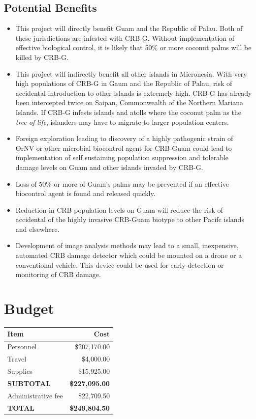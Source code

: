 \documentclass[12pt,letterpaper,english,bibliography=totocnumbered, abstract=on]{scrartcl}
\begin{document}
\subsection{Potential Benefits}
\begin{itemize}
\item This project will directly benefit Guam and the Republic of Palau.
Both of these jurisdictions are infested with CRB-G. Without implementation
of effective biological control, it is likely that 50\% or more coconut
palms will be killed by CRB-G.
\item This project will indirectly benefit all other islands in Micronesia.
With very high populations of CRB-G in Gaum and the Republic of Palau,
risk of accidental introduction to other islands is extremely high.
CRB-G has already been intercepted twice on Saipan, Commonwealth of
the Northern Mariana Islands. If CRB-G infests islands and atolls
where the coconut palm as the \emph{tree of life}, islanders may have
to migrate to larger population centers.
\item Foreign exploration leading to discovery of a highly pathogenic strain
of OrNV or other microbial biocontrol agent for CRB-Guam could lead
to implementation of self sustaining population suppression and tolerable
damage levels on Guam and other islands invaded by CRB-G. 
\item Loss of 50\% or more of Guam's palms may be prevented if an effective
biocontrol agent is found and released quickly. 
\item Reduction in CRB population levels on Guam will reduce the risk of
accidental of the highly invasive CRB-Guam biotype to other Pacifc
islands and elsewhere. 
\item Development of image analysis methods may lead to a small, inexpensive,
automated CRB damage detector which could be mounted on a drone or
a conventional vehicle. This device could be used for early detection
or monitoring of CRB damage.
\end{itemize}

\section{Budget}

\begin{center}
\begin{tabular}{lr}
\hline 
\textbf{Item} & \textbf{Cost}\tabularnewline
\hline 
Personnel & \$207,170.00 \tabularnewline
Travel &  \$4,000.00 \tabularnewline
Supplies & \$15,925.00 \tabularnewline
\hline 
\textbf{SUBTOTAL} & \textbf{\$227,095.00} \tabularnewline
\hline
Administrative fee & \$22,709.50 \tabularnewline
\hline 
\textbf{TOTAL} &  \textbf{\$249,804.50} \tabularnewline
\hline 
\end{tabular} 
\par\end{center}
\end{document}
